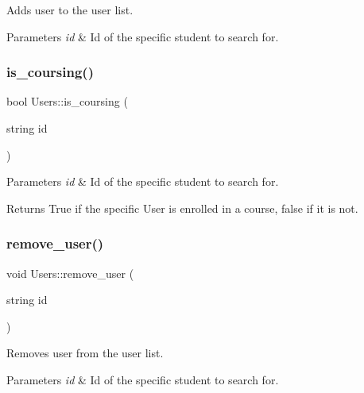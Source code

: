 Adds user to the user list. 
\begin{DoxyParams}{Parameters}
{\em id} & Id of the specific student to search for. \\
\hline
\end{DoxyParams}
\mbox{\label{classUsers_a738f8ab0628118c122f3a1189771f83a}} 
\subsubsection{\texorpdfstring{is\+\_\+coursing()}{is\_coursing()}}
{\footnotesize\ttfamily bool Users\+::is\+\_\+coursing (\begin{DoxyParamCaption}\item[{string}]{id }\end{DoxyParamCaption})}


\begin{DoxyParams}{Parameters}
{\em id} & Id of the specific student to search for. \\
\hline
\end{DoxyParams}
\begin{DoxyReturn}{Returns}
True if the specific User is enrolled in a course, false if it is not. 
\end{DoxyReturn}
\mbox{\label{classUsers_a9cc297190f54720aec510ec52db45a76}} 
\subsubsection{\texorpdfstring{remove\+\_\+user()}{remove\_user()}}
{\footnotesize\ttfamily void Users\+::remove\+\_\+user (\begin{DoxyParamCaption}\item[{string}]{id }\end{DoxyParamCaption})}

Removes user from the user list. 
\begin{DoxyParams}{Parameters}
{\em id} & Id of the specific student to search for. \\
\hline
\end{DoxyParams}
\mbox{\label{classUsers_ab67282f015a76f4f18efa96921564164}} 

